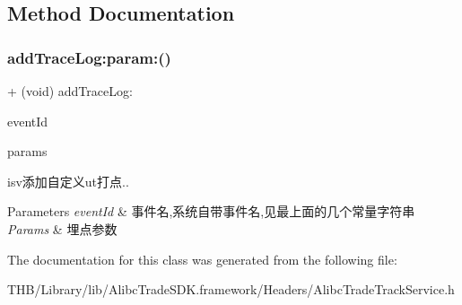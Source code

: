 \subsection{Method Documentation}
\mbox{\label{interface_alibc_trade_track_service_aa9fd4e0e300758f2e38ed2129a3860a8}} 
\subsubsection{\texorpdfstring{add\+Trace\+Log\+:param\+:()}{addTraceLog:param:()}}
{\footnotesize\ttfamily + (void) add\+Trace\+Log\+: \begin{DoxyParamCaption}\item[{(N\+S\+String $\ast$)}]{event\+Id }\item[{param:(\mbox{\hyperlink{interface_alibc_track_params}{Alibc\+Track\+Params}} $\ast$)}]{params }\end{DoxyParamCaption}}

isv添加自定义ut打点..


\begin{DoxyParams}{Parameters}
{\em event\+Id} & 事件名,系统自带事件名,见最上面的几个常量字符串 \\
\hline
{\em Params} & 埋点参数 \\
\hline
\end{DoxyParams}


The documentation for this class was generated from the following file\+:\begin{DoxyCompactItemize}
\item 
T\+H\+B/\+Library/lib/\+Alibc\+Trade\+S\+D\+K.\+framework/\+Headers/Alibc\+Trade\+Track\+Service.\+h\end{DoxyCompactItemize}
